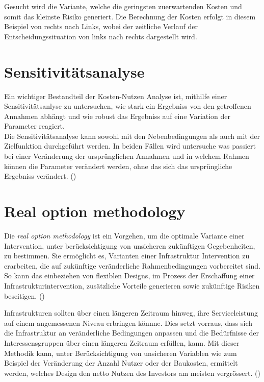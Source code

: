 Gesucht wird die Variante, welche die geringsten zuerwartenden Kosten und somit das kleinste Risiko generiert. Die Berechnung der Kosten erfolgt in diesem Beispiel von rechts nach Links, wobei der zeitliche Verlauf der Entscheidungssituation von links nach rechts dargestellt wird. 

\section{Sensitivitätsanalyse}
\label{sec:Sensitivität}

Ein wichtiger Bestandteil der Kosten-Nutzen Analyse ist, mithilfe einer Sensitivitätsanlyse zu untersuchen, wie stark ein Ergebniss von den getroffenen Annahmen abhängt und wie robust das Ergebniss auf eine Variation der Parameter reagiert. \\
Die Sensitivitätsanalyse kann sowohl mit den Nebenbedingungen als auch mit der Zielfunktion durchgeführt werden. In beiden Fällen wird untersuche was passiert bei einer Veränderung der ursprünglichen Annahmen und in welchem Rahmen können die Parameter verändert werden, ohne das sich das ursprüngliche Ergebniss verändert.  (\cite{Adey2019})

\pagebreak
 
\section{Real option methodology}
\label{sec:RealOption}

Die \textit{real option methodology} ist ein Vorgehen, um die optimale Variante einer Intervention, unter berücksichtigung von unsicheren zukünftigen Gegebenheiten, zu bestimmen. 
Sie ermöglicht es, Varianten einer Infrastruktur Intervention zu erarbeiten, die auf zukünftige veränderliche Rahmenbedingungen vorbereitet sind. So kann das einbeziehen von flexiblen Designs, im Prozess der Erschaffung einer Infrastrukturintervention, zusätzliche Vorteile generieren sowie zukünftige Risiken beseitigen. (\cite{Neufville2011})

Infrastrukturen sollten über einen längeren Zeitraum hinweg, ihre Serviceleistung auf einem angemessenen Niveau erbringen könnne. Dies setzt vorraus, dass sich die Infrastruktur an veränderliche Bedingungen anpassen und die Bedürfnisse der Interessensgruppen über einen längeren Zeitraum erfüllen, kann. 
Mit dieser Methodik kann, unter Berücksichtigung von unsicheren Variablen wie zum Beispiel der Veränderung der Anzahl Nutzer oder der Baukosten, ermittelt werden, welches Design den netto Nutzen des Investors am meisten vergrössert. (\cite{Esders2015})




%

